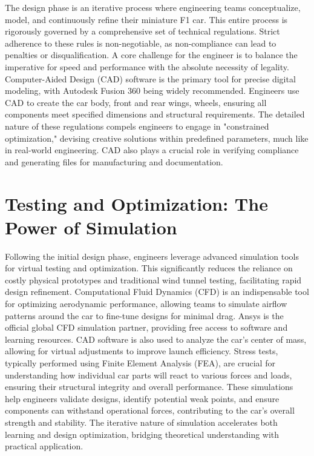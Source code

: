 The design phase is an iterative process where engineering teams conceptualize, model, and continuously refine their miniature F1 car. This entire process is rigorously governed by a comprehensive set of technical regulations. Strict adherence to these rules is non-negotiable, as non-compliance can lead to penalties or disqualification. A core challenge for the engineer is to balance the imperative for speed and performance with the absolute necessity of legality. Computer-Aided Design (CAD) software is the primary tool for precise digital modeling, with Autodesk Fusion 360 being widely recommended. Engineers use CAD to create the car body, front and rear wings, wheels, ensuring all components meet specified dimensions and structural requirements. The detailed nature of these regulations compels engineers to engage in "constrained optimization," devising creative solutions within predefined parameters, much like in real-world engineering. CAD also plays a crucial role in verifying compliance and generating files for manufacturing and documentation. 

\section{Testing and Optimization: The Power of Simulation}

Following the initial design phase, engineers leverage advanced simulation tools for virtual testing and optimization. This significantly reduces the reliance on costly physical prototypes and traditional wind tunnel testing, facilitating rapid design refinement. Computational Fluid Dynamics (CFD) is an indispensable tool for optimizing aerodynamic performance, allowing teams to simulate airflow patterns around the car to fine-tune designs for minimal drag. Ansys is the official global CFD simulation partner, providing free access to software and learning resources. CAD software is also used to analyze the car's center of mass, allowing for virtual adjustments to improve launch efficiency. Stress tests, typically performed using Finite Element Analysis (FEA), are crucial for understanding how individual car parts will react to various forces and loads, ensuring their structural integrity and overall performance. These simulations help engineers validate designs, identify potential weak points, and ensure components can withstand operational forces, contributing to the car's overall strength and stability. The iterative nature of simulation accelerates both learning and design optimization, bridging theoretical understanding with practical application.

